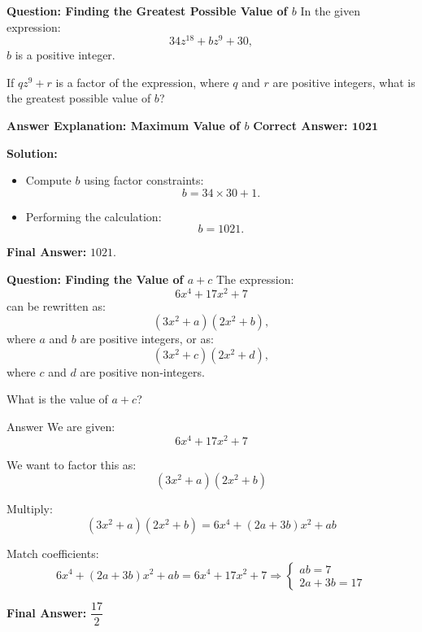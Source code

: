 \documentclass{beamer}
\begin{document}
\begin{frame}{\textbf{Question: Finding the Greatest Possible Value of \( b \)}}
    In the given expression:
    \[
    34z^{18} + bz^9 + 30,
    \]
    \( b \) is a positive integer.  

    \vspace{0.3cm}
    If \( qz^9 + r \) is a factor of the expression, where \( q \) and \( r \) are positive integers, what is the greatest possible value of \( b \)?
\end{frame}

\begin{frame}{\textbf{Answer Explanation: Maximum Value of \( b \)}}
    \textbf{Correct Answer: \textcolor{novelPurple}{\( \mathbf{1021} \)}}  

    \vspace{0.3cm}
    \textbf{Solution:}
    \begin{itemize}
        \item Compute \( b \) using factor constraints:
        \[
        b = 34 \times 30 + 1.
        \]
        \item Performing the calculation:
        \[
        b = 1021.
        \]
    \end{itemize}
    \textbf{Final Answer:} \( \boxed{1021} \).
\end{frame}

\begin{frame}{\textbf{Question: Finding the Value of \( a + c \)}}
    The expression:
    \[
    6x^4 + 17x^2 + 7
    \]
    can be rewritten as:
    \[
    (3x^2 + a)(2x^2 + b),
    \]
    where \( a \) and \( b \) are positive integers, or as:
    \[
    (3x^2 + c)(2x^2 + d),
    \]
    where \( c \) and \( d \) are positive non-integers.  

    \vspace{0.3cm}
    What is the value of \( a + c \)?
\end{frame}

\begin{frame}{Answer}
We are given:
\[
6x^4 + 17x^2 + 7
\]

We want to factor this as:
\[
(3x^2 + a)(2x^2 + b)
\]

Multiply:
\[
(3x^2 + a)(2x^2 + b) = 6x^4 + (2a + 3b)x^2 + ab
\]

Match coefficients:
\[
6x^4 + (2a + 3b)x^2 + ab = 6x^4 + 17x^2 + 7
\Rightarrow
\begin{cases}
ab = 7 \\
2a + 3b = 17
\end{cases}
\]




\textbf{Final Answer:} $\boxed{\dfrac{17}{2}}$
\end{frame}
\end{document}
